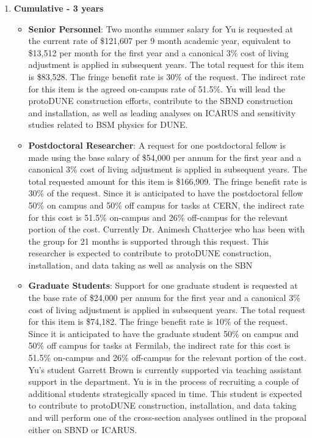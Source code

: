 \begin{enumerate}
\item{\bf Cumulative - 3 years}

\begin{itemize}[noitemsep,nolistsep]
\item{{\bf Senior Personnel}: Two months summer salary for Yu is requested at the current rate of \$121,607 per 9 month academic year, equivalent to \$13,512 per month for the first year and a canonical 3\% cost of living adjustment is applied in subsequent years.  The total request for this item is \$83,528. The fringe benefit rate is 30\% of the request.  The indirect rate for this item is the agreed on-campus rate of 51.5\%. Yu will lead the protoDUNE construction efforts, contribute to the SBND construction and installation, as well as leading analyses on ICARUS and sensitivity studies related to BSM physics for DUNE.}

\item {{\bf Postdoctoral Researcher}: A request for one postdoctoral fellow is made using the base salary of \$54,000 per annum for the first year and a canonical 3\% cost of living adjustment is applied in subsequent years.  The total requested amount for this item is \$166,909. The fringe benefit rate is 30\% of the request.  Since it is anticipated to have the postdoctoral fellow 50\% on campus and 50\% off campus for tasks at CERN, the indirect rate for this cost is 51.5\% on-campus and 26\% off-campus for the relevant portion of the cost.  Currently Dr. Animesh Chatterjee who has been with the group for 21 months is supported through this request. This researcher is expected to contribute to protoDUNE construction, installation, and data taking as well as analysis on the SBN} 

\item{{\bf Graduate Students}: Support for one graduate student is requested at the base rate of \$24,000 per annum for the first year and a canonical 3\% cost of living adjustment is applied in subsequent years. The total request for this item is \$74,182.  The fringe benefit rate is 10\% of the request.  Since it is anticipated to have the graduate student 50\% on campus and 50\% off campus for tasks at Fermilab, the indirect rate for this cost is 51.5\% on-campus and 26\% off-campus for the relevant portion of the cost.   Yu’s student Garrett Brown is currently supported via teaching assistant support in the department.   Yu is in the process of recruiting a couple of additional students strategically spaced in time. This student is expected to contribute to protoDUNE construction, installation, and data taking and will perform one of the cross-section analyses outlined in the proposal either on SBND or ICARUS.}


\end{itemize}
\end{enumerate}
